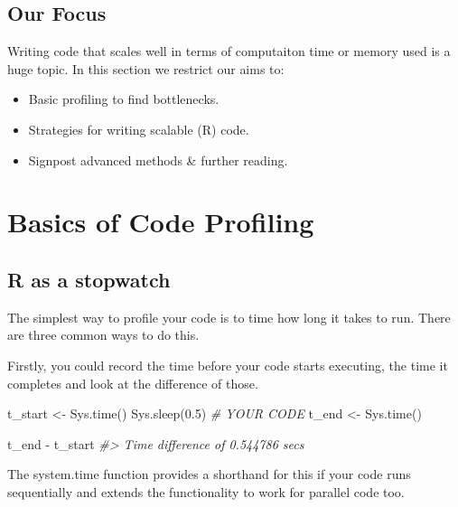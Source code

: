 \documentclass[
  12pt,
]{book}
\newenvironment{Shaded}{\begin{snugshade}}{\end{snugshade}}
\newcommand{\CommentTok}[1]{\textcolor[rgb]{0.56,0.35,0.01}{\textit{#1}}}
\newcommand{\FloatTok}[1]{\textcolor[rgb]{0.00,0.00,0.81}{#1}}
\newcommand{\FunctionTok}[1]{\textcolor[rgb]{0.00,0.00,0.00}{#1}}
\newcommand{\NormalTok}[1]{#1}
\newcommand{\OtherTok}[1]{\textcolor[rgb]{0.56,0.35,0.01}{#1}}
\newcommand{\SpecialCharTok}[1]{\textcolor[rgb]{0.00,0.00,0.00}{#1}}
\providecommand{\tightlist}{%
  \setlength{\itemsep}{0pt}\setlength{\parskip}{0pt}}
\begin{document}
\hypertarget{our-focus}{%
\subsection{Our Focus}\label{our-focus}}

Writing code that scales well in terms of computaiton time or memory used is a huge topic. In this section we restrict our aims to:

\begin{itemize}
\tightlist
\item
  Basic profiling to find bottlenecks.
\item
  Strategies for writing scalable (R) code.
\item
  Signpost advanced methods \& further reading.
\end{itemize}

\hypertarget{basics-of-code-profiling}{%
\section{Basics of Code Profiling}\label{basics-of-code-profiling}}

\hypertarget{r-as-a-stopwatch}{%
\subsection{R as a stopwatch}\label{r-as-a-stopwatch}}

The simplest way to profile your code is to time how long it takes to run. There are three common ways to do this.

Firstly, you could record the time before your code starts executing, the time it completes and look at the difference of those.

\begin{Shaded}
\begin{Highlighting}[]
\NormalTok{t\_start }\OtherTok{\textless{}{-}} \FunctionTok{Sys.time}\NormalTok{()}
\FunctionTok{Sys.sleep}\NormalTok{(}\FloatTok{0.5}\NormalTok{) }\CommentTok{\# YOUR CODE}
\NormalTok{t\_end }\OtherTok{\textless{}{-}} \FunctionTok{Sys.time}\NormalTok{()}

\NormalTok{t\_end }\SpecialCharTok{{-}}\NormalTok{ t\_start}
\CommentTok{\#\textgreater{} Time difference of 0.544786 secs}
\end{Highlighting}
\end{Shaded}

The system.time function provides a shorthand for this if your code runs sequentially and extends the functionality to work for parallel code too.
\end{document}
